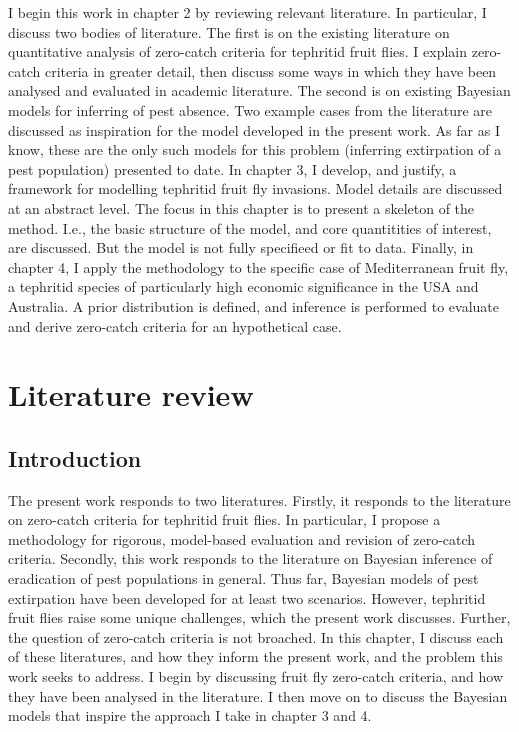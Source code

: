 \documentclass[
  oneside]{book}
\begin{document}
I begin this work in chapter 2 by reviewing relevant literature. In particular, I discuss two bodies of literature. The first is on the existing literature on quantitative analysis of zero-catch criteria for tephritid fruit flies. I explain zero-catch criteria in greater detail, then discuss some ways in which they have been analysed and evaluated in academic literature. The second is on existing Bayesian models for inferring of pest absence. Two example cases from the literature are discussed as inspiration for the model developed in the present work. As far as I know, these are the only such models for this problem (inferring extirpation of a pest population) presented to date. In chapter 3, I develop, and justify, a framework for modelling tephritid fruit fly invasions. Model details are discussed at an abstract level. The focus in this chapter is to present a skeleton of the method. I.e., the basic structure of the model, and core quantitities of interest, are discussed. But the model is not fully specifieed or fit to data. Finally, in chapter 4, I apply the methodology to the specific case of Mediterranean fruit fly, a tephritid species of particularly high economic significance in the USA and Australia. A prior distribution is defined, and inference is performed to evaluate and derive zero-catch criteria for an hypothetical case.

\hypertarget{lit-review}{%
\chapter{Literature review}\label{lit-review}}

\hypertarget{introduction-1}{%
\section{Introduction}\label{introduction-1}}

The present work responds to two literatures. Firstly, it responds to the literature on zero-catch criteria for tephritid fruit flies. In particular, I propose a methodology for rigorous, model-based evaluation and revision of zero-catch criteria. Secondly, this work responds to the literature on Bayesian inference of eradication of pest populations in general. Thus far, Bayesian models of pest extirpation have been developed for at least two scenarios. However, tephritid fruit flies raise some unique challenges, which the present work discusses. Further, the question of zero-catch criteria is not broached. In this chapter, I discuss each of these literatures, and how they inform the present work, and the problem this work seeks to address. I begin by discussing fruit fly zero-catch criteria, and how they have been analysed in the literature. I then move on to discuss the Bayesian models that inspire the approach I take in chapter 3 and 4.
\end{document}
